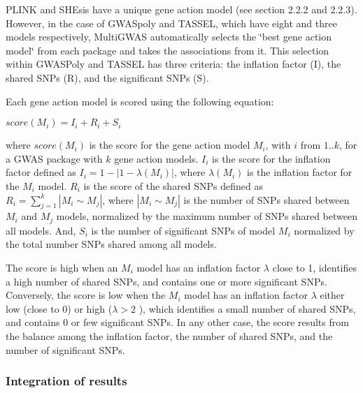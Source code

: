 \documentclass{article}
\begin{document}
PLINK and SHEsis have a unique gene action model (see section 2.2.2 and 2.2.3). However, in the case of GWASpoly and TASSEL, which have eight and three models respectively, MultiGWAS automatically selects the \char`\"{}best gene action model\char`\"{} from each package and takes the associations from it. This selection within GWASPoly and TASSEL has three criteria: the inflation factor (I), the shared SNPs (R), and the significant SNPs (S).

Each gene action model is scored using the following equation: 
\begin{center}
$score(M_{i})=I{}_{i}+R_{i}+S{}_{i}$
\par\end{center}

where $score(M_{i})$ is the score for the gene action model $M_{i}$, with $i$ from $1..k$, for a GWAS package with $k$ gene action models. $I_{i}$ is the score for the inflation factor defined as $I_{i}=1-|1-\lambda(M_{i})|$, where $\lambda(M_{i})$ is the inflation factor for the $M_{i}$ model. $R_{i}$ is the score of the shared SNPs defined as $R_{i}=\sum\limits _{j=1}^{k}{\textstyle |M_{i}\sim M_{j}|}$, where ${\textstyle |M_{i}\sim M_{j}|}$ is the number of SNPs shared between $M_{i}$ and $M_{j}$ models, normalized by the maximum number of SNPs shared between all models. And, $S_{i}$ is the number of significant SNPs of model $M_{i}$ normalized by the total number SNPs shared among all models.


The score is high when an $M_{i}$ model has an inflation factor $\lambda$ close to 1, identifies a high number of shared SNPs, and contains one or more significant SNPs. Conversely, the score is low when the $M_{i}$ model has an inflation factor $\lambda$ either low (close to 0) or high ($\lambda>2$ ), which identifies a small number of shared SNPs, and contains 0 or few significant SNPs. In any other case, the score results from the balance among the inflation factor, the number of shared SNPs, and the number of significant SNPs.


\subsubsection{Integration of results}
\end{document}
